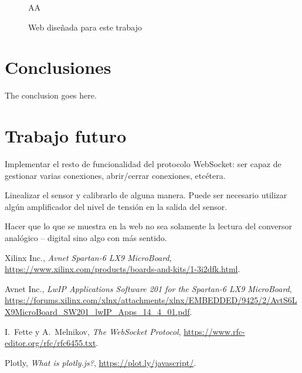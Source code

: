 \documentclass[conference,compsoc]{IEEEtran}
\begin{document}
		\begin{figure}[h!]
			\centering
			AA
			\caption{Web dise\~nada para este trabajo}
			\label{fig:web_cliente}
		\end{figure}



	\section{Conclusiones}

		The conclusion goes here.

	\section{Trabajo futuro}

		Implementar el resto de funcionalidad del protocolo WebSocket: ser capaz de gestionar varias
		conexiones, abrir/cerrar conexiones, etc\'etera.

		Linealizar el sensor y calibrarlo de alguna manera. Puede ser necesario utilizar alg\'un
		amplificador del nivel de tensi\'on en la salida del sensor.

		Hacer que lo que se muestra en la web no sea solamente la lectura del conversor anal\'ogico
		-- digital sino algo con m\'as sentido.

	
	\begin{thebibliography}{1}

			Xilinx Inc., \emph{Avnet Spartan-6 LX9 MicroBoard}, \url{https://www.xilinx.com/products/boards-and-kits/1-3i2dfk.html}.

			Avnet Inc., \emph{LwIP Applications Software 201 for the Spartan-6 LX9 MicroBoard}, \url{https://forums.xilinx.com/xlnx/attachments/xlnx/EMBEDDED/9425/2/AvtS6LX9MicroBoard_SW201_lwIP_Apps_14_4_01.pdf}.

			I.~Fette y A.~Melnikov, \emph{The WebSocket Protocol}, \url{https://www.rfc-editor.org/rfc/rfc6455.txt}.

			Plotly, \emph{What is plotly.js?}, \url{https://plot.ly/javascript/}.

	\end{thebibliography}
\end{document}
